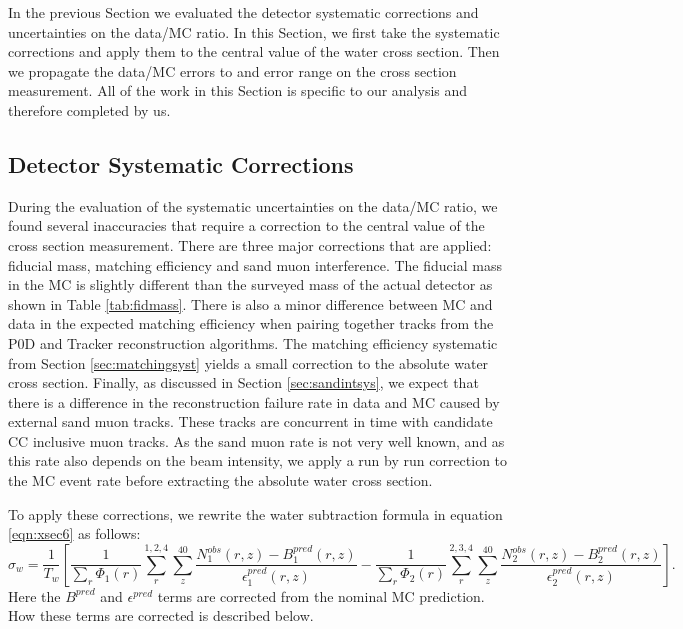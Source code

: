 In the previous Section we evaluated the detector systematic corrections and uncertainties on the data/MC ratio. In this Section, we first take the systematic corrections and apply them to the central value of the water cross section. Then we propagate the data/MC errors to and error range on the cross section measurement. All of the work in this Section is specific to our analysis and therefore completed by us.

\subsection{Detector Systematic Corrections}

During the evaluation of the systematic uncertainties on the data/MC ratio, we found several inaccuracies that require a correction to the central value of the cross section measurement. There are three major corrections that are applied: fiducial mass, matching efficiency and sand muon interference. The fiducial mass in the MC is slightly different than the surveyed mass of the actual detector as shown in Table \ref{tab:fidmass}. There is also a minor difference between MC and data in the expected matching efficiency when pairing together tracks from the P0D and Tracker reconstruction algorithms. The matching efficiency systematic from Section \ref{sec:matchingsyst} yields a small correction to the absolute water cross section. Finally, as discussed in Section \ref{sec:sandintsys}, we expect that there is a difference in the reconstruction failure rate in data and MC caused by external sand muon tracks. These tracks are concurrent in time with candidate CC inclusive muon tracks. As the sand muon rate is not very well known, and as this rate also depends on the beam intensity, we apply a run by run correction to the MC event rate before extracting the absolute water cross section. 

To apply these corrections, we rewrite the water subtraction formula in equation \ref{eqn:xsec6} as follows:
\begin{equation}
\sigma_w = \frac{1}{T_w}\left[\frac{1}{\sum\limits_r \Phi_1(r)}\sum\limits_{r}^{1,2,4} \sum\limits_{z}^{40} \frac{N^{obs}_1(r,z)-B^{pred}_1(r,z)}{\epsilon^{pred}_1(r,z)}-\frac{1}{\sum\limits_r \Phi_2(r)}\sum\limits_{r}^{2,3,4} \sum\limits_{z}^{40} \frac{N^{obs}_2(r,z)-B^{pred}_2(r,z)}{\epsilon^{pred}_2(r,z)}\right].
\end{equation}
Here the $B^{pred}$ and $\epsilon^{pred}$ terms are corrected from the nominal MC prediction. How these terms are corrected is described below.

